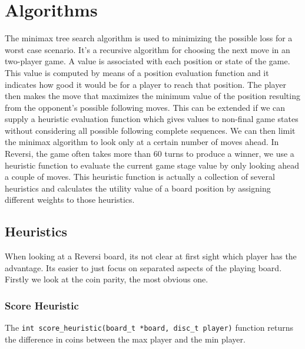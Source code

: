 
\chapter{Algorithms}\label{chapter:algo}
The minimax tree search algorithm is used to minimizing the possible loss for a worst case  scenario. It’s a recursive algorithm for choosing the next move in an two-player game. \newline A value is associated with each position or state of the game. This value is computed by means of a position evaluation function and it indicates how good it would be for a player to reach that position. The player then makes the move that maximizes the minimum value of the position resulting from the opponent's possible following moves. This can be extended if we can supply a heuristic evaluation function which gives values to non-final game states without considering all possible following complete sequences. We can then limit the minimax algorithm to look only at a certain number of moves ahead. In Reversi, the game often takes more than 60 turns to produce a winner, we use a heuristic function to evaluate the current game stage value by only looking ahead a couple of moves. This heuristic function is actually a collection of several heuristics and calculates the utility value of a board position by assigning different weights to those heuristics.
\section{Heuristics}
When looking at a Reversi board, its not clear at first sight which player has the advantage. Its easier to just focus on separated aspects of the playing board. Firstly we look at the coin parity, the most obvious one.
\subsection{Score Heuristic}
The \verb|int score_heuristic(board_t *board, disc_t player)| function returns the difference in coins between the max player and the min player.

